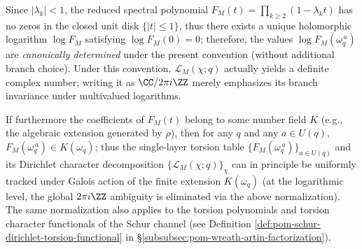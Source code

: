 \begin{remark}\label{rem:finite-part-torsion-log-branch-normalization}
Since \(|\lambda_k|<1\), the reduced spectral polynomial \(F_M(t)=\prod_{k\ge2}(1-\lambda_k t)\) has no zeros in the closed unit disk \(\{|t|\le1\}\),
thus there exists a unique holomorphic logarithm \(\log F_M\) satisfying \(\log F_M(0)=0\); therefore, the values \(\log F_M(\omega_q^{\,a})\) are \emph{canonically determined} under the present convention (without additional branch choice).
Under this convention, \(\mathcal{L}_M(\chi;q)\) actually yields a definite complex number; writing it as \(\CC/2\pi i\ZZ\) merely emphasizes its branch invariance under multivalued logarithms.
\par
If furthermore the coefficients of \(F_M(t)\) belong to some number field \(K\) (e.g., the algebraic extension generated by \(\rho\)), then for any \(q\) and any \(a\in U(q)\),
\(
F_M(\omega_q^{\,a})\in K(\omega_q)
\);
thus the single-layer torsion table \(\{F_M(\omega_q^{\,a})\}_{a\in U(q)}\) and its Dirichlet character decomposition
\(\{\mathcal{L}_M(\chi;q)\}_\chi\)
can in principle be uniformly tracked under Galois action of the finite extension \(K(\omega_q)\) (at the logarithmic level, the global \(2\pi i\ZZ\) ambiguity is eliminated via the above normalization).
The same normalization also applies to the torsion polynomials and torsion character functionals of the Schur channel (see Definition \ref{def:pom-schur-dirichlet-torsion-functional} in \S\ref{subsubsec:pom-wreath-artin-factorization}).
\end{remark}
